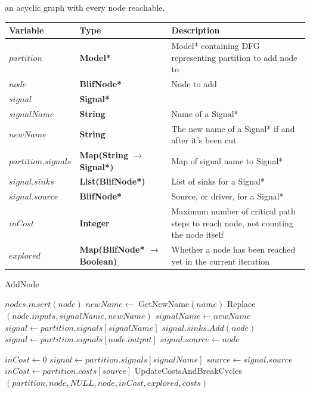 \documentclass[12pt,final,oneside]{dwThesis} %
\begin{document}
   an acyclic graph with every node reachable.  \begin{algorithm}
      \begin{center} \begin{tabularx}{\linewidth}{llX} \toprule Variable & Type
            & Description\\ \midrule $partition$ &\textbf{  Model* } &  Model*
            containing DFG representing partition to add node to\\ $node$
            &\textbf{  BlifNode* } &  Node to add\\ $signal$ &\textbf{  Signal*
            } &  \\ $signalName$ &\textbf{ String } &  Name of a Signal*\\
            $newName$ &\textbf{ String } &  The new name of a Signal* if and
            after it's been cut\\ $partition.signals$ &\textbf{  Map(String
               $\to$ Signal*) } &  Map of signal name to Signal* \\
            $signal.sinks$ &\textbf{  List(BlifNode*) } &  List of sinks for a
            Signal* \\ $signal.source$ &\textbf{  BlifNode* } &  Source, or
            driver, for a Signal* \\ $inCost$ &\textbf{ Integer } &  Maximum
            number of critical path steps to reach node, not counting the node
            itself \\ $explored$ &\textbf{  Map(BlifNode* $\to$ Boolean) } &
            Whether a node has been reached yet in the current iteration \\
            \bottomrule \end{tabularx} \end{center}
      \caption{AddNode}\label{addnode} \begin{algorithmic}[1]
          \State $nodes.insert(node)$
           \State
         $newName \gets$ GetNewName$(name)$ 
         \State Replace$(node.inputs, signalName, newName)$  \State $signalName
         \gets newName$ \EndIf \State $signal \gets
         partition.signals[signalName]$ \State $signal.sinks.Add(node)$ \EndFor
         \State $signal \gets partition.signals[node.output]$ \State
         $signal.source \gets node$

         \State $inCost \gets 0$  \State
         $signal \gets partition.signals[signalName]$ \State $source \gets
         signal.source$  \State $inCost
         \gets partition.costs[source]$ \EndIf \EndFor \State
         UpdateCostsAndBreakCycles$(partition, node, NULL, node, inCost,
         explored, costs)$ \EndProcedure \end{algorithmic} \end{algorithm}
\end{document}
